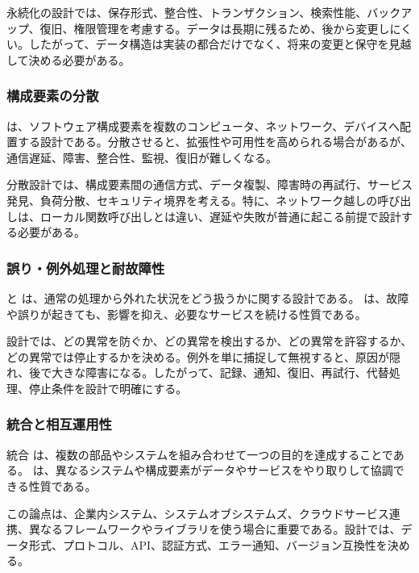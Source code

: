 \documentclass[a4paper,11pt]{ltjsarticle}
\numberwithin{figure}{section}
\numberwithin{table}{section}
\begin{document}
永続化の設計では、保存形式、整合性、トランザクション、検索性能、バックアップ、復旧、権限管理を考慮する。データは長期に残るため、後から変更しにくい。したがって、データ構造は実装の都合だけでなく、将来の変更と保守を見越して決める必要がある。

\subsubsection{構成要素の分散}

 は、ソフトウェア構成要素を複数のコンピュータ、ネットワーク、デバイスへ配置する設計である。分散させると、拡張性や可用性を高められる場合があるが、通信遅延、障害、整合性、監視、復旧が難しくなる。

分散設計では、構成要素間の通信方式、データ複製、障害時の再試行、サービス発見、負荷分散、セキュリティ境界を考える。特に、ネットワーク越しの呼び出しは、ローカル関数呼び出しとは違い、遅延や失敗が普通に起こる前提で設計する必要がある。

\subsubsection{誤り・例外処理と耐故障性}

 と は、通常の処理から外れた状況をどう扱うかに関する設計である。 は、故障や誤りが起きても、影響を抑え、必要なサービスを続ける性質である。

設計では、どの異常を防ぐか、どの異常を検出するか、どの異常を許容するか、どの異常では停止するかを決める。例外を単に捕捉して無視すると、原因が隠れ、後で大きな障害になる。したがって、記録、通知、復旧、再試行、代替処理、停止条件を設計で明確にする。

\subsubsection{統合と相互運用性}

統合 は、複数の部品やシステムを組み合わせて一つの目的を達成することである。 は、異なるシステムや構成要素がデータやサービスをやり取りして協調できる性質である。

この論点は、企業内システム、システムオブシステムズ、クラウドサービス連携、異なるフレームワークやライブラリを使う場合に重要である。設計では、データ形式、プロトコル、API、認証方式、エラー通知、バージョン互換性を決める。
\end{document}
